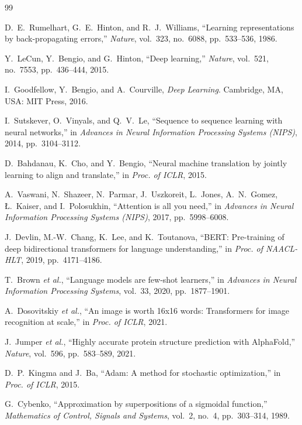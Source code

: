 \documentclass[conference]{IEEEtran}
\begin{document}
\begin{thebibliography}{99}

 D.~E.~Rumelhart, G.~E.~Hinton, and R.~J.~Williams, ``Learning representations by back-propagating errors,'' \emph{Nature}, vol.~323, no.~6088, pp.~533--536, 1986.

 Y.~LeCun, Y.~Bengio, and G.~Hinton, ``Deep learning,'' \emph{Nature}, vol.~521, no.~7553, pp.~436--444, 2015.

 I.~Goodfellow, Y.~Bengio, and A.~Courville, \emph{Deep Learning}. Cambridge, MA, USA: MIT Press, 2016.

 I.~Sutskever, O.~Vinyals, and Q.~V.~Le, ``Sequence to sequence learning with neural networks,'' in \emph{Advances in Neural Information Processing Systems (NIPS)}, 2014, pp.~3104--3112.

 D.~Bahdanau, K.~Cho, and Y.~Bengio, ``Neural machine translation by jointly learning to align and translate,'' in \emph{Proc. of ICLR}, 2015.

 A.~Vaswani, N.~Shazeer, N.~Parmar, J.~Uszkoreit, L.~Jones, A.~N.~Gomez, {\L}.~Kaiser, and I.~Polosukhin, ``Attention is all you need,'' in \emph{Advances in Neural Information Processing Systems (NIPS)}, 2017, pp.~5998--6008.

 J.~Devlin, M.-W.~Chang, K.~Lee, and K.~Toutanova, ``BERT: Pre-training of deep bidirectional transformers for language understanding,'' in \emph{Proc. of NAACL-HLT}, 2019, pp.~4171--4186.

 T.~Brown \emph{et al.}, ``Language models are few-shot learners,'' in \emph{Advances in Neural Information Processing Systems}, vol.~33, 2020, pp.~1877--1901.

 A.~Dosovitskiy \emph{et al.}, ``An image is worth 16x16 words: Transformers for image recognition at scale,'' in \emph{Proc. of ICLR}, 2021.

 J.~Jumper \emph{et al.}, ``Highly accurate protein structure prediction with AlphaFold,'' \emph{Nature}, vol.~596, pp.~583--589, 2021.

 D.~P.~Kingma and J.~Ba, ``Adam: A method for stochastic optimization,'' in \emph{Proc. of ICLR}, 2015.

 G.~Cybenko, ``Approximation by superpositions of a sigmoidal function,'' \emph{Mathematics of Control, Signals and Systems}, vol.~2, no.~4, pp.~303--314, 1989.


\end{thebibliography}
\end{document}
